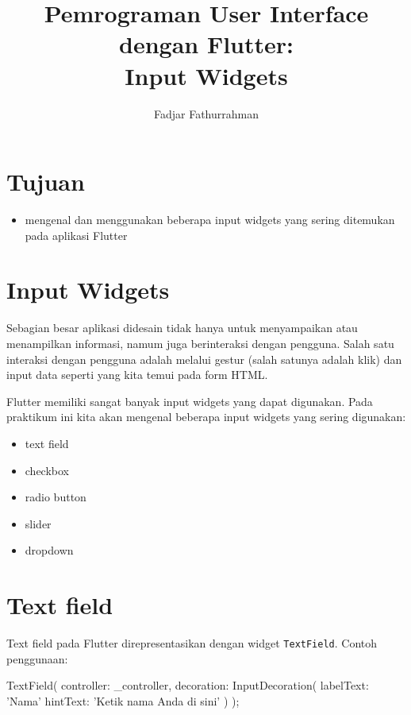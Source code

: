 \documentclass[a4paper,11pt]{article} %
\newcommand{\txtinline}[1]{\texttt{#1}}
\begin{document}
\title{Pemrograman User Interface dengan Flutter:\\
Input Widgets}
\author{Fadjar Fathurrahman}
\date{}
\maketitle

\section{Tujuan}

\begin{itemize}
\item mengenal dan menggunakan beberapa input widgets yang sering ditemukan
pada aplikasi Flutter
\end{itemize}

\section{Input Widgets}

Sebagian besar aplikasi didesain tidak hanya untuk menyampaikan atau menampilkan
informasi, namum juga berinteraksi dengan pengguna. Salah satu interaksi dengan
pengguna adalah melalui gestur (salah satunya adalah klik) dan input data seperti
yang kita temui pada form HTML.

Flutter memiliki sangat banyak input widgets yang dapat digunakan.
Pada praktikum ini kita akan mengenal beberapa
input widgets yang sering digunakan:
\begin{itemize}
\item text field
\item checkbox
\item radio button
\item slider
\item dropdown
\end{itemize}

\section{Text field}

Text field pada Flutter direpresentasikan dengan widget \txtinline{TextField}.
Contoh penggunaan:

\begin{dartcode}
TextField(
  controller: _controller,
  decoration: InputDecoration(
    labelText: 'Nama'
    hintText: 'Ketik nama Anda di sini'
  )
);
\end{dartcode}
\end{document}

